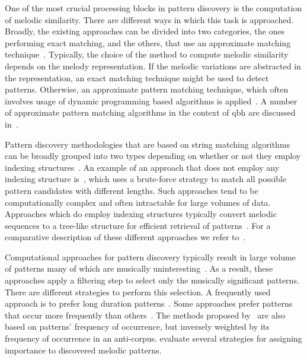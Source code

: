 One of the most crucial processing blocks in pattern discovery is the computation of melodic similarity. There are different ways in which this task is approached. Broadly, the existing approaches can be divided into two categories, the ones performing exact matching, and the others, that use an approximate matching technique~\citep{cambouropoulos2001pattern}. Typically, the choice of the method to compute melodic similarity depends on the melody representation. If the melodic variations are abstracted in the representation, an exact matching technique might be used to detect patterns. Otherwise, an approximate pattern matching technique, which often involves usage of dynamic programming based algorithms is applied~\citep{rolland1999discovering}. A number of approximate pattern matching algorithms in the context of \gls{qbh} are discussed in~. 

Pattern discovery methodologies that are based on string matching algorithms can be broadly grouped into two types depending on whether or not they employ indexing structures~\cite{Janssen2013}. An example of an approach that does not employ any indexing structure is~\citep{nieto2012perceptual}, which uses a brute-force strategy to match all possible pattern candidates with different lengths. Such approaches tend to be computationally complex and often intractable for large volumes of data. Approaches which do employ indexing structures typically convert melodic sequences to a tree-like structure for efficient retrieval of patterns~\citep{Knopke2009,conklin2011comparative}. For a comparative description of these different approaches we refer to~\citep{Janssen2013,meredith2002algorithms}.

Computational approaches for pattern discovery typically result in large volume of patterns many of which are musically uninteresting~\citep{marsden2012counselling,conklin2010discovery}. As a result, these approaches apply a filtering step to select only the musically significant patterns. There are different strategies to perform this selection. A frequently used approach is to prefer long duration patterns~\citep{Cambouropoulos2006,Karydis2006}. Some approaches prefer patterns that occur more frequently than others~\citep{Cambouropoulos2006,meredith2002algorithms}. The methods proposed by~\cite{conklin2010discovery,Conklin2010a} are also based on patterns' frequency of occurrence, but inversely weighted by its frequency of occurrence in an anti-corpus. \cite{collins2011modeling} evaluate several strategies for assigning importance to discovered melodic patterns.

